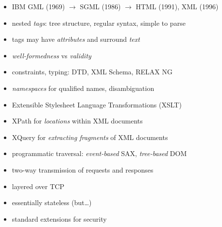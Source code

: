 \documentclass{sepslide-soa-faked} %
\begin{document}
\begin{slide}
\begin{itemize}
\item IBM GML (1969) $\to$ SGML (1986) $\to$ HTML (1991), XML (1996)
\item nested \emph{tags}: tree structure, regular syntax, simple to parse
\item tags may have \emph{attributes} and surround \emph{text}
\item \emph{well-formedness} vs \emph{validity}
\item constraints, typing: DTD, XML Schema, RELAX NG
\item \emph{namespaces} for qualified names, disambiguation
\item Extensible Stylesheet Language Transformations (XSLT)
\item XPath for \emph{locations} within XML documents
\item XQuery for \emph{extracting fragments} of XML documents
\item programmatic traversal: \emph{event-based} SAX, \emph{tree-based} DOM
\end{itemize}
\end{slide}

\begin{slide}
\begin{itemize}
\item two-way transmission of requests and responses
\item layered over TCP
\item essentially stateless (but\ldots)
\item standard extensions for security
\end{itemize}
\end{slide}
\end{document}
